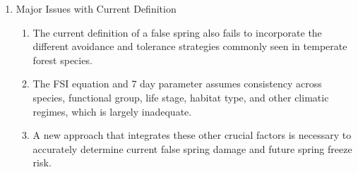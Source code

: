 \documentclass{article}\usepackage[]{graphicx}\usepackage[]{color}
\begin{document}
\begin{enumerate}
\item Major Issues with Current Definition
\begin{enumerate}
\item The current definition of a false spring also fails to incorporate the different avoidance and tolerance strategies commonly seen in temperate forest species.
\item The FSI equation and 7 day parameter assumes consistency across species, functional group, life stage, habitat type, and other climatic regimes, which is largely inadequate. 
\item A new approach that integrates these other crucial factors is necessary to accurately determine current false spring damage and future spring freeze risk. 
\end{enumerate}
\end{enumerate}
\end{document}
